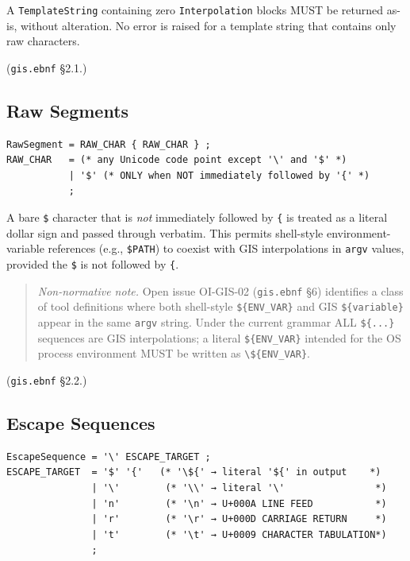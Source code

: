 A \texttt{TemplateString} containing zero \texttt{Interpolation} blocks MUST
be returned as-is, without alteration.
No error is raised for a template string that contains only raw characters.

(\texttt{gis.ebnf} \S2.1.)

\subsection{Raw Segments}
\label{subsec:gis:raw}

\begin{verbatim}
RawSegment = RAW_CHAR { RAW_CHAR } ;
RAW_CHAR   = (* any Unicode code point except '\' and '$' *)
           | '$' (* ONLY when NOT immediately followed by '{' *)
           ;
\end{verbatim}

A bare \texttt{\$} character that is \emph{not} immediately followed by
\texttt{\{} is treated as a literal dollar sign and passed through verbatim.
This permits shell-style environment-variable references
(e.g., \texttt{\$PATH}) to coexist with GIS interpolations in
\texttt{argv} values, provided the \texttt{\$} is not followed by \texttt{\{}.

\begin{quote}
\noindent\textit{Non-normative note.}
Open issue OI-GIS-02 (\texttt{gis.ebnf} \S6) identifies a class of tool
definitions where both shell-style \texttt{\$\{ENV\_VAR\}} and GIS
\texttt{\$\{variable\}} appear in the same \texttt{argv} string.
Under the current grammar ALL \texttt{\$\{...\}} sequences are GIS
interpolations; a literal \texttt{\$\{ENV\_VAR\}} intended for the OS
process environment MUST be written as \texttt{\textbackslash\$\{ENV\_VAR\}}.
\end{quote}

(\texttt{gis.ebnf} \S2.2.)

\subsection{Escape Sequences}
\label{subsec:gis:escapes}

\begin{verbatim}
EscapeSequence = '\' ESCAPE_TARGET ;
ESCAPE_TARGET  = '$' '{'   (* '\${' → literal '${' in output    *)
               | '\'        (* '\\' → literal '\'                *)
               | 'n'        (* '\n' → U+000A LINE FEED           *)
               | 'r'        (* '\r' → U+000D CARRIAGE RETURN     *)
               | 't'        (* '\t' → U+0009 CHARACTER TABULATION*)
               ;
\end{verbatim}

